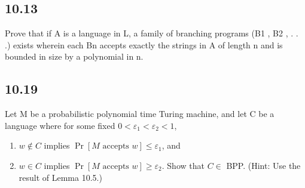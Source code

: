 \subsection*{10.13}

Prove that if A is a language in L, a family of branching programs (B1 , B2 , . . .) exists wherein each Bn accepts exactly the strings in A of length n and is bounded in size by a polynomial in n.


\subsection*{10.19}

Let M be a probabilistic polynomial time Turing machine, and let C be a language where for some fixed $0 < \varepsilon_1 < \varepsilon_2 < 1$,

\begin{enumerate}[label=(\alph*), leftmargin=2.5em]

\item $w \notin C$ implies $\Pr[M \text{ accepts } w] \le \varepsilon_1$, and

\item $w \in C$ implies $\Pr[M \text{ accepts } w] \ge \varepsilon_2$. Show that $C \in$ BPP. (Hint: Use the result of Lemma 10.5.)

\end{enumerate}


\clearpage
